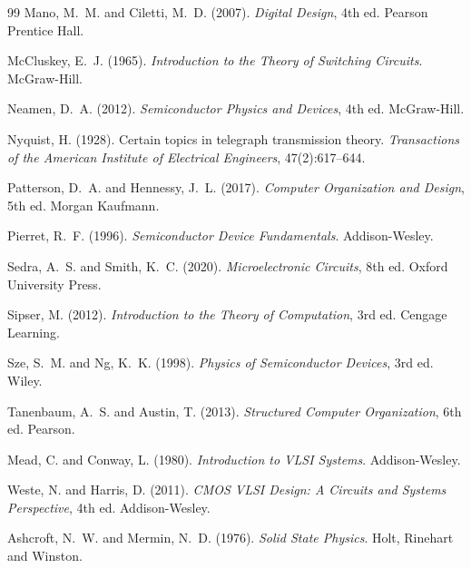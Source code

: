 \documentclass[12pt, a4paper]{article}
\theoremstyle{definition}
\theoremstyle{remark}
\begin{document}
\begin{thebibliography}{99}
Mano, M.~M. and Ciletti, M.~D. (2007).
\newblock \textit{Digital Design}, 4th ed.
\newblock Pearson Prentice Hall.

McCluskey, E.~J. (1965).
\newblock \textit{Introduction to the Theory of Switching Circuits}.
\newblock McGraw-Hill.

Neamen, D.~A. (2012).
\newblock \textit{Semiconductor Physics and Devices}, 4th ed.
\newblock McGraw-Hill.

Nyquist, H. (1928).
\newblock Certain topics in telegraph transmission theory.
\newblock \textit{Transactions of the American Institute of Electrical Engineers}, 47(2):617--644.

Patterson, D.~A. and Hennessy, J.~L. (2017).
\newblock \textit{Computer Organization and Design}, 5th ed.
\newblock Morgan Kaufmann.

Pierret, R.~F. (1996).
\newblock \textit{Semiconductor Device Fundamentals}.
\newblock Addison-Wesley.

Sedra, A.~S. and Smith, K.~C. (2020).
\newblock \textit{Microelectronic Circuits}, 8th ed.
\newblock Oxford University Press.

Sipser, M. (2012).
\newblock \textit{Introduction to the Theory of Computation}, 3rd ed.
\newblock Cengage Learning.

Sze, S.~M. and Ng, K.~K. (1998).
\newblock \textit{Physics of Semiconductor Devices}, 3rd ed.
\newblock Wiley.

Tanenbaum, A.~S. and Austin, T. (2013).
\newblock \textit{Structured Computer Organization}, 6th ed.
\newblock Pearson.

Mead, C. and Conway, L. (1980).
\newblock \textit{Introduction to VLSI Systems}.
\newblock Addison-Wesley.

Weste, N. and Harris, D. (2011).
\newblock \textit{CMOS VLSI Design: A Circuits and Systems Perspective}, 4th ed.
\newblock Addison-Wesley.

Ashcroft, N.~W. and Mermin, N.~D. (1976).
\newblock \textit{Solid State Physics}.
\newblock Holt, Rinehart and Winston.


\end{thebibliography}
\end{document}

